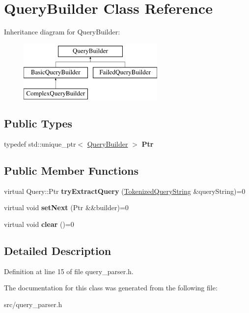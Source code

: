 \hypertarget{class_query_builder}{}\section{Query\+Builder Class Reference}
\label{class_query_builder}
Inheritance diagram for Query\+Builder\+:\begin{figure}[H]
\begin{center}
\leavevmode
\includegraphics[height=3.000000cm]{class_query_builder}
\end{center}
\end{figure}
\subsection*{Public Types}
\begin{DoxyCompactItemize}
\item 
\mbox{\label{class_query_builder_a7398eb0c7e35f50ba1e652f48e56cfe8}} 
typedef std\+::unique\+\_\+ptr$<$ \hyperlink{class_query_builder}{Query\+Builder} $>$ {\bfseries Ptr}
\end{DoxyCompactItemize}
\subsection*{Public Member Functions}
\begin{DoxyCompactItemize}
\item 
\mbox{\label{class_query_builder_ac072e9756978c3235e935a46ba7bf3de}} 
virtual Query\+::\+Ptr {\bfseries try\+Extract\+Query} (\hyperlink{struct_tokenized_query_string}{Tokenized\+Query\+String} \&query\+String)=0
\item 
\mbox{\label{class_query_builder_a45ba6361743c5b9942cf8264662fab62}} 
virtual void {\bfseries set\+Next} (Ptr \&\&builder)=0
\item 
\mbox{\label{class_query_builder_a0be553ef138e355c4f7dd8e5d5711bee}} 
virtual void {\bfseries clear} ()=0
\end{DoxyCompactItemize}


\subsection{Detailed Description}


Definition at line 15 of file query\+\_\+parser.\+h.



The documentation for this class was generated from the following file\+:\begin{DoxyCompactItemize}
\item 
src/query\+\_\+parser.\+h\end{DoxyCompactItemize}
